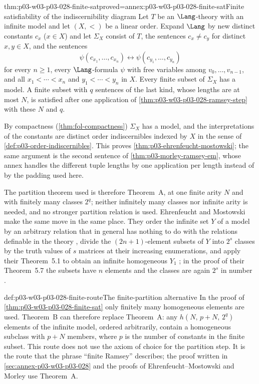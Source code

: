 \begin{hblemma}{thm:p03-w03-p03-028-finite-sat}{proved=annex:p03-w03-p03-028-finite-sat}{Finite satisfiability of the indiscernibility diagram}
Let \(T\) be an \(\Lang\)-theory with an infinite model and let \((X,<)\)
be a linear order.  Expand \(\Lang\) by new distinct constants \(c_x\)
(\(x\in X\)) and let \(\Sigma_X\) consist of \(T\), the sentences
\(c_x\neq c_y\) for distinct \(x,y\in X\), and the sentences
\[
  \psi(c_{x_1},\ldots,c_{x_n})\leftrightarrow\psi(c_{y_1},\ldots,c_{y_n})
\]
for every \(n\geq1\), every \(\Lang\)-formula \(\psi\) with free variables
among \(v_0,\ldots,v_{n-1}\), and all \(x_1<\cdots<x_n\) and
\(y_1<\cdots<y_n\) in \(X\).  Every finite subset of \(\Sigma_X\) has a
model.  A finite subset with \(q\) sentences of the last kind, whose
lengths are at most \(N\), is satisfied after one application of
\cref{thm:p03-w03-p03-028-ramsey-step} with these \(N\) and \(q\).
\end{hblemma}

By compactness (\cref{thm:fol-compactness}) \(\Sigma_X\) has a model,
and the interpretations of the constants are distinct order indiscernibles
indexed by \(X\) in the sense of \cref{def:p03-order-indiscernibles}.  This
proves \cref{thm:p03-ehrenfeucht-mostowski}; the same argument is the
second sentence of \cref{thm:p03-morley-ramsey-em}, whose annex handles the
different tuple lengths by one application per length instead of by the
padding used here.

The partition theorem used is therefore Theorem~A, at one finite arity
\(N\) and with finitely many classes \(2^q\); neither infinitely many
classes nor infinite arity is needed, and no stronger partition relation
is used.  Ehrenfeucht and Mostowski make the same move in the same
place.  They order the infinite set \(Y\) of a model by an arbitrary
relation that in general has nothing to do with the relations definable in
the theory \cite[p.~61]{EhrenfeuchtMostowski1956}, divide the
\((2n+1)\)-element subsets of \(Y\) into \(2^s\) classes by the truth values
of \(s\) matrices at their increasing enumerations, and apply their
Theorem~5.1 to obtain an infinite homogeneous \(Y_1\)
\cite[pp.~61--62]{EhrenfeuchtMostowski1956}; in the proof of their
Theorem~5.7 the subsets have \(n\) elements and the classes are again
\(2^s\) in number \cite[p.~64]{EhrenfeuchtMostowski1956}.

\begin{hbmethod}{def:p03-w03-p03-028-finite-route}{The finite-partition alternative}
In the proof of \cref{thm:p03-w03-p03-028-finite-sat} only finitely many
homogeneous elements are used.  Theorem~B can therefore replace Theorem~A:
any \(h(N,\,p+N,\,2^q)\) elements of the infinite model, ordered
arbitrarily, contain a homogeneous subclass with \(p+N\) members, where
\(p\) is the number of constants in the finite subset.  This route does not
use the axiom of choice for the partition step.  It is the route that the
phrase ``finite Ramsey'' describes; the proof written in
\cref{sec:annex-p03-w03-p03-028} and the proofs of
Ehrenfeucht--Mostowski and Morley use Theorem~A.
\end{hbmethod}

